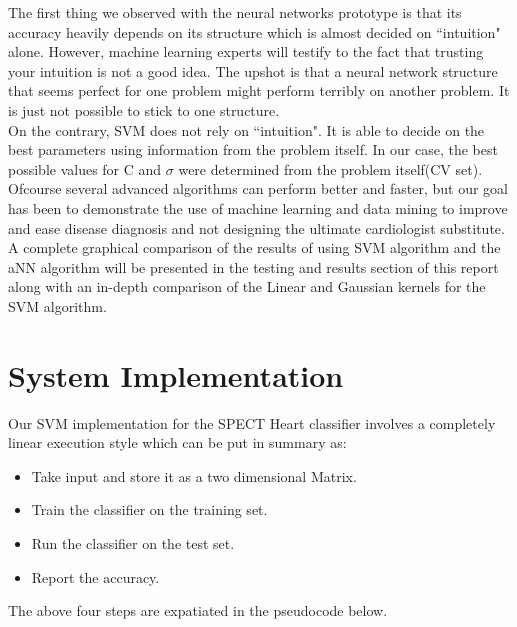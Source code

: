 \documentclass[11pt,a4paper]{report}
\begin{document}
{The first thing we observed with the neural networks prototype is that its accuracy heavily depends on its structure which is almost decided on ``intuition" alone.  However, machine learning experts will testify to the fact that trusting your intuition is not a good idea. The upshot is that a neural network structure that seems perfect for one problem might perform terribly on another problem. It is just not possible to stick to one structure.  \\

    
On the contrary, SVM does not rely on ``intuition". It is able to decide on the best parameters using information from the problem itself. In our case, the best possible values for C and $\sigma$ were determined from the problem itself(CV set).\\

Ofcourse several advanced algorithms can perform better and faster, but our goal has been to demonstrate the use of machine learning and data mining to improve and ease disease diagnosis and not designing the ultimate cardiologist substitute.\\

A complete graphical comparison of the results of using SVM algorithm and the aNN algorithm will be presented in the testing and results section of this report along with an in-depth comparison of the Linear and Gaussian kernels for the SVM algorithm.



\chapter{System Implementation}

Our SVM implementation for the SPECT Heart classifier involves a completely linear execution style which can be put in summary as:\\

\begin{itemize}    
\item Take input and store it as a two dimensional Matrix.\\
\item Train the classifier on the training set.\\        
\item Run the classifier on the test set. \\
\item Report the accuracy. \\
\end{itemize}
The above four steps are expatiated in the pseudocode below.\\
\bigskip

}
\end{document}
